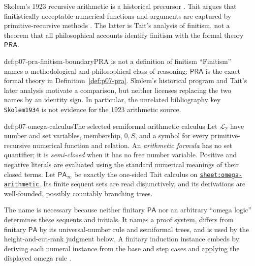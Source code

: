 Skolem's 1923 recursive arithmetic is a historical precursor
\cite{Skolem1923}.  Tait argues that finitistically acceptable numerical
functions and arguments are captured by primitive-recursive methods
\cite{Tait1981}.  The latter is Tait's analysis of finitism, not a theorem
that all philosophical accounts identify finitism with the formal theory
\(\mathsf{PRA}\).

\begin{hbwarning}{def:p07-pra-finitism-boundary}{PRA is not a definition of finitism}
``Finitism'' names a methodological and philosophical class of reasoning;
\(\mathsf{PRA}\) is the exact formal theory in
Definition~\ref{def:p07-pra}.  Skolem's historical program and Tait's later
analysis motivate a comparison, but neither licenses replacing the two names
by an identity sign.  In particular, the unrelated bibliography key
\texttt{Skolem1934} is not evidence for the 1923 arithmetic source.
\end{hbwarning}

\begin{hbdefinition}{def:p07-omega-calculus}{The selected semiformal arithmetic calculus}
Let \(\mathcal L_2\) have number and set variables, membership, \(0,S\), and a
symbol for every primitive-recursive numerical function and relation.  An
\emph{arithmetic formula} has no set quantifier; it is \emph{semi-closed} when
it has no free number variable.  Positive and negative literals are evaluated
using the standard numerical meanings of their closed terms.  Let
\(\mathsf{PA}_{\infty}\) be exactly the one-sided Tait calculus on
\hyperref[sheet:omega-arithmetic]{\texttt{sheet:omega-arithmetic}}.  Its finite
sequent sets are read disjunctively, and its derivations are well-founded,
possibly countably branching trees.

The name is necessary because neither finitary \(\mathsf{PA}\) nor an arbitrary
``omega logic'' determines these sequents and initials.  It names a proof
system, differs from finitary \(\mathsf{PA}\) by its universal-number rule and
semiformal trees, and is used by the height-and-cut-rank judgment below.  A
finitary induction instance embeds by deriving each numeral instance from the
base and step cases and applying the displayed omega rule
\cite{Schuette1977,JagerProbst2004}.
\end{hbdefinition}

